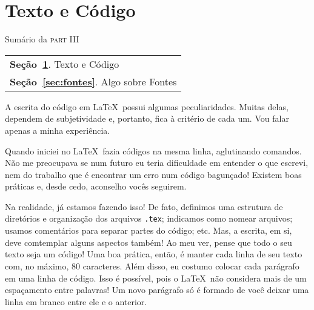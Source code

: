 \section{Texto e Código} %
\label{sec:textoCodigo}

\begin{margintable}\vspace{.8in}\footnotesize
  \caption{Sumário da \textsc{part III}}
  \medskip
  \begin{tabularx}{\marginparwidth}{|X}
    \textbf{\sffamily \textcolor{azulUFRB}{Seção}~\ref{sec:textoCodigo}}.    {\sffamily Texto e Código} \\
    \textbf{\sffamily \textcolor{azulUFRB}{Seção}~\ref{sec:fontes}}.    {\sffamily Algo sobre Fontes} \\
  \end{tabularx}
\end{margintable}

A escrita do código em \LaTeX\ possui algumas peculiaridades.
Muitas delas, dependem de subjetividade e, portanto, fica à critério de cada um.
Vou falar apenas a minha experiência.

Quando iniciei no \LaTeX\ fazia códigos na mesma linha, aglutinando comandos.
Não me preocupava se num futuro eu teria dificuldade em entender o que escrevi, 
nem do trabalho que é encontrar um erro num código bagunçado!
Existem boas práticas e, desde cedo, aconselho vocês seguirem.

Na realidade, já estamos fazendo isso!
De fato, definimos uma estrutura de diretórios e organização dos arquivos 
\texttt{.tex}; indicamos como nomear arquivos; usamos comentários para separar 
partes do código; etc. 
Mas, a escrita, em si, deve comtemplar alguns aspectos também!
Ao meu ver, pense que todo o seu texto seja um código!
Uma boa prática, então, é manter cada linha de seu texto com, no máximo, 80 
caracteres.
Além disso, eu costumo colocar cada parágrafo em uma linha de código.
Isso é possível, pois o \LaTeX\ não considera mais de um espaçamento entre 
palavras!
Um novo parágrafo só é formado de você deixar uma linha em branco entre ele e o
anterior.


